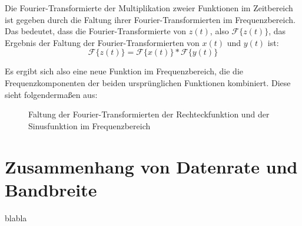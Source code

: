 Die Fourier-Transformierte der Multiplikation zweier Funktionen im Zeitbereich ist gegeben durch die Faltung ihrer Fourier-Transformierten im Frequenzbereich. Das bedeutet, dass die Fourier-Transformierte von $z(t)$, also $\mathcal{F}\{z(t)\}$, das Ergebnis der Faltung der Fourier-Transformierten von $x(t)$ und $y(t)$ ist:
\[
\mathcal{F}\{z(t)\} = \mathcal{F}\{x(t)\} * \mathcal{F}\{y(t)\}
\]

Es ergibt sich also eine neue Funktion im Frequenzbereich, die die Frequenzkomponenten der beiden ursprünglichen Funktionen kombiniert. Diese sieht folgendermaßen aus:
\begin{figure}[H]
    \centering
    \caption{Faltung der Fourier-Transformierten der Rechteckfunktion und der Sinusfunktion im Frequenzbereich}
    \label{fig:faltung_rechteck_sinus}
\end{figure}
\section{Zusammenhang von Datenrate und Bandbreite}
blabla
\clearpage